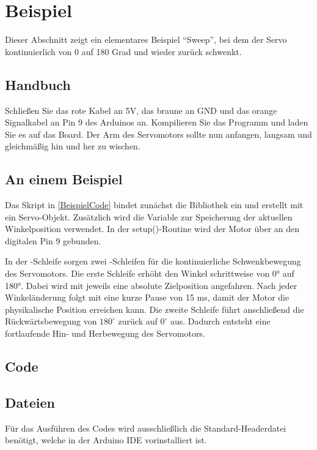 \section{Beispiel}
Dieser Abschnitt zeigt ein elementares Beispiel "`Sweep"', bei dem der Servo kontinuierlich von 0 auf 180 Grad und wieder zurück schwenkt.

\subsection{Handbuch}
Schlie\ss en Sie das rote Kabel an 5V, das braune an GND und das orange Signalkabel an Pin 9 des Arduinos an. Kompilieren Sie das Programm und laden Sie es auf das Board. Der Arm des Servomotors sollte nun anfangen, langsam und gleichmä\ss ig hin und her zu wischen.

\subsection{An einem Beispiel}
Das Skript in \ref{BeispielCode} bindet zunächst die Bibliothek  ein und erstellt mit  ein Servo-Objekt. Zusätzlich wird die Variable  zur Speicherung der aktuellen Winkelposition verwendet. In der setup()-Routine wird der Motor über  an den digitalen Pin 9 gebunden.

In der -Schleife sorgen zwei -Schleifen für die kontinuierliche Schwenkbewegung des Servomotors. Die erste Schleife erhöht den Winkel schrittweise von 0° auf 180°. Dabei wird mit  jeweils eine absolute Zielposition angefahren. Nach jeder Winkeländerung folgt mit  eine kurze Pause von 15 ms, damit der Motor die physikalische Position erreichen kann. Die zweite Schleife führt anschlie\ss end die Rückwärtsbewegung von $180^\circ$ zurück auf $0^\circ$ aus. Dadurch entsteht eine fortlaufende Hin- und Herbewegung des Servomotors.

\subsection{Code}
\begin{center}
	 \label{BeispielCode}  
\end{center}

\subsection{Dateien}
Für das Ausführen des Codes wird ausschlie\ss lich die Standard-Headerdatei  benötigt, welche in der Arduino IDE vorinstalliert ist.

